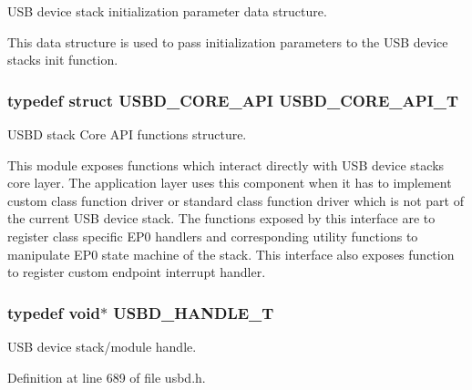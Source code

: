 U\+SB device stack initialization parameter data structure. 

This data structure is used to pass initialization parameters to the U\+SB device stack\textquotesingle{}s init function. 
\subsubsection[{\texorpdfstring{U\+S\+B\+D\+\_\+\+C\+O\+R\+E\+\_\+\+A\+P\+I\+\_\+T}{USBD_CORE_API_T}}]{\setlength{\rightskip}{0pt plus 5cm}typedef struct {\bf U\+S\+B\+D\+\_\+\+C\+O\+R\+E\+\_\+\+A\+PI}  {\bf U\+S\+B\+D\+\_\+\+C\+O\+R\+E\+\_\+\+A\+P\+I\+\_\+T}}\hypertarget{group__USBD__Core_ga6a53e8395d1c68f98d18ca4a49b75baa}{}\label{group__USBD__Core_ga6a53e8395d1c68f98d18ca4a49b75baa}


U\+S\+BD stack Core A\+PI functions structure. 

This module exposes functions which interact directly with U\+SB device stack\textquotesingle{}s core layer. The application layer uses this component when it has to implement custom class function driver or standard class function driver which is not part of the current U\+SB device stack. The functions exposed by this interface are to register class specific E\+P0 handlers and corresponding utility functions to manipulate E\+P0 state machine of the stack. This interface also exposes function to register custom endpoint interrupt handler. 
\subsubsection[{\texorpdfstring{U\+S\+B\+D\+\_\+\+H\+A\+N\+D\+L\+E\+\_\+T}{USBD_HANDLE_T}}]{\setlength{\rightskip}{0pt plus 5cm}typedef void$\ast$ {\bf U\+S\+B\+D\+\_\+\+H\+A\+N\+D\+L\+E\+\_\+T}}\hypertarget{group__USBD__Core_gafdbb2204d929cb9d75736bd2b42342ac}{}\label{group__USBD__Core_gafdbb2204d929cb9d75736bd2b42342ac}
U\+SB device stack/module handle. 

Definition at line 689 of file usbd.\+h.


